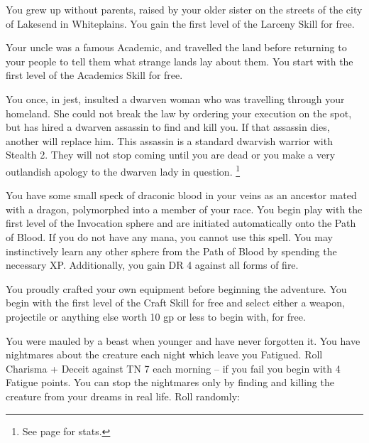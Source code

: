 \begin{multicols}{2}
\begin{list}{\addtocounter{list}{1}\textbf{:}}{\raggedleft}
  \item
  You grew up without parents, raised by your older sister on the streets of the city of Lakesend in Whiteplains.
  You gain the first level of the Larceny Skill for free.

  \item
  Your uncle was a famous Academic, and travelled the land before returning to your people to tell them what strange lands lay about them.
  You start with the first level of the Academics Skill for free.

  \item
  You once, in jest, insulted a dwarven woman who was travelling through your homeland.
  She could not break the law by ordering your execution on the spot, but has hired a dwarven assassin to find and kill you.
  If that assassin dies, another will replace him.
  This assassin is a standard dwarvish warrior with Stealth 2.
  They will not stop coming until you are dead or you make a very outlandish apology to the dwarven lady in question.
  \footnote{See page \pageref{dwarven_soldier} for stats.}

  \item
  You have some small speck of draconic blood in your veins as an ancestor mated with a dragon, polymorphed into a member of your race.
  You begin play with the first level of the Invocation sphere and are initiated automatically onto the Path of Blood.
  If you do not have any mana, you cannot use this spell.
  You may instinctively learn any other sphere from the Path of Blood by spending the necessary XP.
  Additionally, you gain DR 4 against all forms of fire.

  \item
  You proudly crafted your own equipment before beginning the adventure.
  You begin with the first level of the Craft Skill for free and select either a weapon, projectile or anything else worth 10 gp or less to begin with, for free.

  \item
  You were mauled by a beast when younger and have never forgotten it.
  You have nightmares about the creature each night which leave you Fatigued.
  Roll Charisma + Deceit against TN 7 each morning -- if you fail you begin with 4 Fatigue points.
  You can stop the nightmares only by finding and killing the creature from your dreams in real life.
  Roll randomly:

  \setcounter{enc}{6}

  \begin{list}{\addtocounter{enc}{-1}}{}


\end{list}
\end{list}
\end{multicols}
